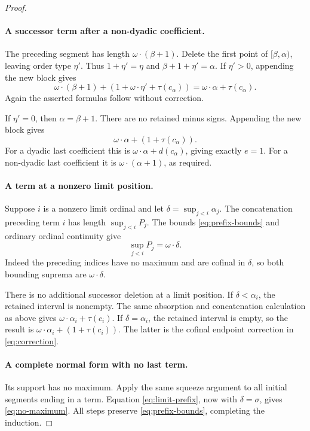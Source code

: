 \documentclass[11pt,letterpaper]{article}
\theoremstyle{definition}
\theoremstyle{remark}
\begin{document}
\begin{proof}
\paragraph{A successor term after a non-dyadic coefficient.}
The preceding segment has length \(\omega\cdot(\beta+1)\).
Delete the first point of \([\beta,\alpha)\), leaving order type
\(\eta'\). Thus \(1+\eta'=\eta\) and
\(\beta+1+\eta'=\alpha\).
If \(\eta'>0\), appending the new block gives
\[
 \omega\cdot(\beta+1)+(1+\omega\cdot\eta'+\tau(c_\alpha))
   =\omega\cdot\alpha+\tau(c_\alpha).
\]
Again the asserted formulas follow without correction.

If \(\eta'=0\), then \(\alpha=\beta+1\). There are no retained
minus signs. Appending the new block gives
\[
 \omega\cdot\alpha+(1+\tau(c_\alpha)).
\]
For a dyadic last coefficient this is
\(\omega\cdot\alpha+d(c_\alpha)\), giving exactly \(e=1\).
For a non-dyadic last coefficient it is
\(\omega\cdot(\alpha+1)\), as required.

\paragraph{A term at a nonzero limit position.}
Suppose \(i\) is a nonzero limit ordinal and let
\(\delta=\sup_{j<i}\alpha_j\). The concatenation preceding term \(i\)
has length \(\sup_{j<i}P_j\). The bounds
\eqref{eq:prefix-bounds} and ordinary ordinal continuity give
\begin{equation}\label{eq:limit-prefix}
 \sup_{j<i}P_j=\omega\cdot\delta.
\end{equation}
Indeed the preceding indices have no maximum and are cofinal in
\(\delta\), so both bounding suprema are \(\omega\cdot\delta\).

There is no additional successor deletion at a limit position. If
\(\delta<\alpha_i\), the retained interval is nonempty. The same
absorption and concatenation calculation as above gives
\(\omega\cdot\alpha_i+\tau(c_i)\). If \(\delta=\alpha_i\), the
retained interval is empty, so the result is
\(\omega\cdot\alpha_i+(1+\tau(c_i))\). The latter is the cofinal
endpoint correction in \eqref{eq:correction}.

\paragraph{A complete normal form with no last term.}
Its support has no maximum. Apply the same squeeze argument to all
initial segments ending in a term. Equation \eqref{eq:limit-prefix}, now
with \(\delta=\sigma\), gives \eqref{eq:no-maximum}.
All steps preserve \eqref{eq:prefix-bounds}, completing the induction.
\end{proof}
\end{document}
